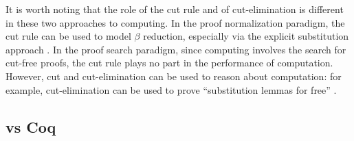 It is worth noting that the role of the cut rule and of
cut-elimination is different in these two approaches to computing.
In the proof normalization paradigm, the cut rule can be used to model
$\beta$ reduction, especially via the explicit substitution approach
\cite{lengrand06phd}. In the proof search paradigm, since computing involves
the search for cut-free proofs, the cut rule plays no part in the
performance of computation.  However, cut and cut-elimination can be
used to reason about computation: for example, cut-elimination can be
used to prove ``substitution lemmas for free'' \cite{gacek12jar}.




\subsection{\lP vs Coq}

